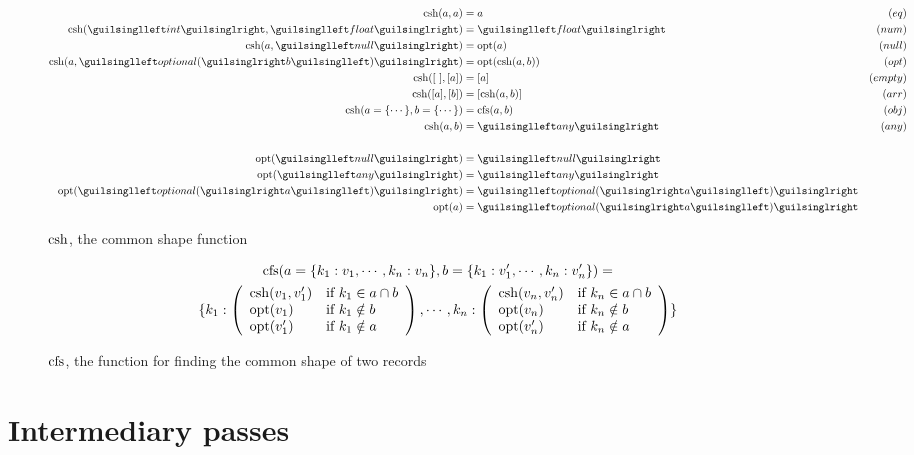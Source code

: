 \begin{figure}[ht!]
\begin{align*}
\csh(a, a)               &=  a               & (eq) \\
\csh(‹int›, ‹float›)     &= ‹float›          & (num) \\
\csh(a, ‹null›)          &= \opt(a)          & (null) \\
\csh(a, ‹optional(›b‹)›) &= \opt(\csh(a, b)) & (opt) \\
\csh([\ ], [a])          &= [a]              & (empty) \\
\csh([a], [b])           &= [\csh(a, b)]     & (arr) \\
\csh(a = \{ \cdots \}, b = \{ \cdots \}) &= \cfs(a, b) & (obj) \\
\csh(a, b)               &= ‹any›            & (any) \\
\\
\opt(‹null›) &= ‹null› \\
\opt(‹any›)  &= ‹any› \\
\opt(‹optional(›a‹)›) &= ‹optional(›a‹)› \\
\opt(a) &= ‹optional(›a‹)›
\end{align*}
\caption{$\operatorname{csh}$, the common shape function}
\label{fig:csh}
\end{figure}

\begin{figure}[ht!]
\begin{gather*}
\operatorname{cfs}(a = \{ k_1 : v_1, \cdots, k_n : v_n \}, b = \{ k_1 : v'_1, \cdots, k_n : v'_n \}) = \\
\{ k_1 : \left( \begin{array}{ll}
  \operatorname{csh}(v_1, v'_1) & \text{if } k_1 \in a \cap b \\
  \operatorname{opt}(v_1) & \text{if } k_1 \notin b \\
  \operatorname{opt}(v'_1) & \text{if } k_1 \notin a
\end{array}\right), \cdots, k_n : \left( \begin{array}{ll}
  \operatorname{csh}(v_n, v'_n) & \text{if } k_n \in a \cap b \\
  \operatorname{opt}(v_n) & \text{if } k_n \notin b \\
  \operatorname{opt}(v'_n) & \text{if } k_n \notin a
\end{array}\right) \}
\end{gather*}
\caption{$\operatorname{cfs}$, the function for finding the common shape of two records}
\label{fig:ufi}
\end{figure}

\section{Intermediary passes}

